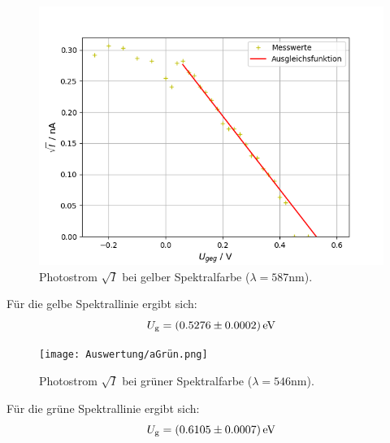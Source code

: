 \documentclass[
  bibliography=totoc,     %
  captions=tableheading,  %
  titlepage=firstiscover, %
]{scrartcl}
\begin{document}
\begin{figure}[H]
    \centering
    \includegraphics[scale=0.7]{Auswertung/aGelb.png}
    \caption{Photostrom $\sqrt{I}$ bei gelber Spektralfarbe ($\lambda = 587 \text{nm}$).}
    \label{fig:gelb}
\end{figure}
Für die gelbe Spektrallinie ergibt sich:
\begin{equation*}
	U_\text{g} = \SI{0,5276 \pm 0,0002}{\eV}
\end{equation*}
	
\begin{figure}[H]
    \centering
    \texttt{[image: Auswertung/aGrün.png]}
    \caption{Photostrom $\sqrt{I}$ bei grüner Spektralfarbe ($\lambda = 546 \text{nm}$).}
    \label{fig:grün}
\end{figure}
Für die grüne Spektrallinie ergibt sich:
\begin{equation*}
	U_\text{g} = \SI{0,6105 \pm 0,0007}{\eV}
\end{equation*}
\end{document}
